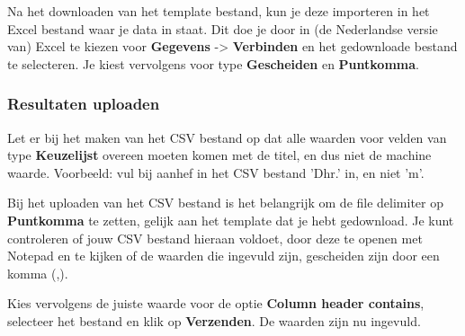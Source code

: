 Na het downloaden van het template bestand, kun je deze importeren in het Excel bestand waar je data in staat. Dit doe je door in (de Nederlandse versie van) Excel te kiezen voor \textbf{Gegevens} -> \textbf{Verbinden} en het gedownloade bestand te selecteren. Je kiest vervolgens voor type \textbf{Gescheiden} en \textbf{Puntkomma}. 

\subsubsection{Resultaten uploaden}

Let er bij het maken van het CSV bestand op dat alle waarden voor velden van type \textbf{Keuzelijst} overeen moeten komen met de titel, en dus niet de machine waarde. Voorbeeld: vul bij aanhef in het CSV bestand 'Dhr.' in, en niet 'm'.

Bij het uploaden van het CSV bestand is het belangrijk om de file delimiter op \textbf{Puntkomma} te zetten, gelijk aan het template dat je hebt gedownload. Je kunt controleren of jouw CSV bestand hieraan voldoet, door deze te openen met Notepad en te kijken of de waarden die ingevuld zijn, gescheiden zijn door een komma (,).

Kies vervolgens de juiste waarde voor de optie \textbf{Column header contains}, selecteer het bestand en klik op \textbf{Verzenden}. De waarden zijn nu ingevuld.